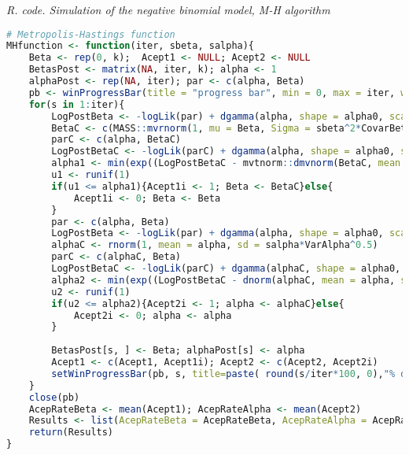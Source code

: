 \begin{tcolorbox}[enhanced,width=4.67in,center upper,
	fontupper=\large\bfseries,drop shadow southwest,sharp corners]
	\textit{R. code. Simulation of the negative binomial model, M-H algorithm}
	\begin{VF}
		\begin{lstlisting}[language=R]
# Metropolis-Hastings function 
MHfunction <- function(iter, sbeta, salpha){
	Beta <- rep(0, k); 	Acept1 <- NULL; Acept2 <- NULL
	BetasPost <- matrix(NA, iter, k); alpha <- 1
	alphaPost <- rep(NA, iter); par <- c(alpha, Beta)
	pb <- winProgressBar(title = "progress bar", min = 0, max = iter, width = 300)
	for(s in 1:iter){
		LogPostBeta <- -logLik(par) + dgamma(alpha, shape = alpha0, scale = delta0, log = TRUE) + mvtnorm::dmvnorm(Beta, mean = b0, sigma = B0, log = TRUE)
		BetaC <- c(MASS::mvrnorm(1, mu = Beta, Sigma = sbeta^2*CovarBetas))
		parC <- c(alpha, BetaC)
		LogPostBetaC <- -logLik(parC) + dgamma(alpha, shape = alpha0, scale = delta0, log = TRUE) +  mvtnorm::dmvnorm(BetaC, mean = b0, sigma = B0, log = TRUE)
		alpha1 <- min(exp((LogPostBetaC - mvtnorm::dmvnorm(BetaC, mean = Beta, sigma = sbeta^2*CovarBetas, log = TRUE))-(LogPostBeta - mvtnorm::dmvnorm(Beta, mean = Beta, sigma = sbeta^2*CovarBetas, log = TRUE))),1)
		u1 <- runif(1)
		if(u1 <= alpha1){Acept1i <- 1; Beta <- BetaC}else{
			Acept1i <- 0; Beta <- Beta
		}
		par <- c(alpha, Beta)
		LogPostBeta <- -logLik(par) + dgamma(alpha, shape = alpha0, scale = delta0, log = TRUE) + mvtnorm::dmvnorm(Beta, mean = b0, sigma = B0, log = TRUE)
		alphaC <- rnorm(1, mean = alpha, sd = salpha*VarAlpha^0.5)
		parC <- c(alphaC, Beta)
		LogPostBetaC <- -logLik(parC) + dgamma(alphaC, shape = alpha0, scale = delta0, log = TRUE) +  mvtnorm::dmvnorm(Beta, mean = b0, sigma = B0, log = TRUE)
		alpha2 <- min(exp((LogPostBetaC - dnorm(alphaC, mean = alpha, sd = salpha*VarAlpha^0.5, log = TRUE))-(LogPostBeta - dnorm(alpha, mean = alpha, sd = salpha*VarAlpha^0.5, log = TRUE))),1)
		u2 <- runif(1)
		if(u2 <= alpha2){Acept2i <- 1; alpha <- alphaC}else{
			Acept2i <- 0; alpha <- alpha
		}
		
		BetasPost[s, ] <- Beta; alphaPost[s] <- alpha
		Acept1 <- c(Acept1, Acept1i); Acept2 <- c(Acept2, Acept2i)
		setWinProgressBar(pb, s, title=paste( round(s/iter*100, 0),"% done"))
	}
	close(pb)
	AcepRateBeta <- mean(Acept1); AcepRateAlpha <- mean(Acept2)
	Results <- list(AcepRateBeta = AcepRateBeta, AcepRateAlpha = AcepRateAlpha, BetasPost = BetasPost, alphaPost = alphaPost)
	return(Results)
}
\end{lstlisting}
	\end{VF}
\end{tcolorbox} 

